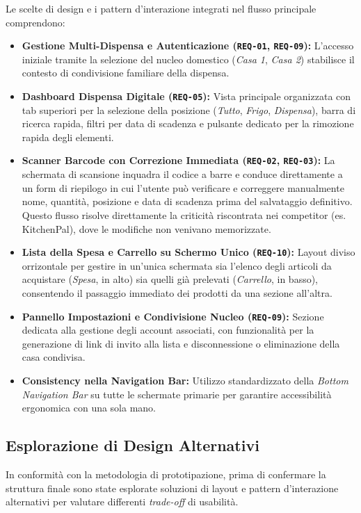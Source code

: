 \documentclass[11pt,a4paper]{article}
\begin{document}
Le scelte di design e i pattern d'interazione integrati nel flusso principale comprendono:
\begin{itemize}
  \item \textbf{Gestione Multi-Dispensa e Autenticazione (\texttt{REQ-01}, \texttt{REQ-09}):} L'accesso iniziale tramite la selezione del nucleo domestico (\textit{Casa 1}, \textit{Casa 2}) stabilisce il contesto di condivisione familiare della dispensa.
  \item \textbf{Dashboard Dispensa Digitale (\texttt{REQ-05}):} Vista principale organizzata con tab superiori per la selezione della posizione (\textit{Tutto}, \textit{Frigo}, \textit{Dispensa}), barra di ricerca rapida, filtri per data di scadenza e pulsante dedicato per la rimozione rapida degli elementi.
  \item \textbf{Scanner Barcode con Correzione Immediata (\texttt{REQ-02}, \texttt{REQ-03}):} La schermata di scansione inquadra il codice a barre e conduce direttamente a un form di riepilogo in cui l'utente può verificare e correggere manualmente nome, quantità, posizione e data di scadenza prima del salvataggio definitivo. Questo flusso risolve direttamente la criticità riscontrata nei competitor (es. KitchenPal), dove le modifiche non venivano memorizzate.
  \item \textbf{Lista della Spesa e Carrello su Schermo Unico (\texttt{REQ-10}):} Layout diviso orrizontale per gestire in un'unica schermata sia l'elenco degli articoli da acquistare (\textit{Spesa}, in alto) sia quelli già prelevati (\textit{Carrello}, in basso), consentendo il passaggio immediato dei prodotti da una sezione all'altra.
  \item \textbf{Pannello Impostazioni e Condivisione Nucleo (\texttt{REQ-09}):} Sezione dedicata alla gestione degli account associati, con funzionalità per la generazione di link di invito alla lista e disconnessione o eliminazione della casa condivisa.
  \item \textbf{Consistency nella Navigation Bar:} Utilizzo standardizzato della \textit{Bottom Navigation Bar} su tutte le schermate primarie per garantire accessibilità ergonomica con una sola mano.
\end{itemize}

\newpage
\subsection{Esplorazione di Design Alternativi}
In conformità con la metodologia di prototipazione, prima di confermare la struttura finale sono state esplorate soluzioni di layout e pattern d'interazione alternativi per valutare differenti \textit{trade-off} di usabilità.
\end{document}
